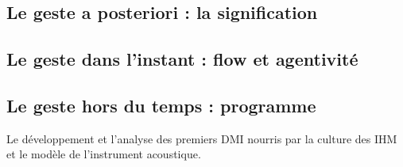 \subsection{Le geste a posteriori : la signification}


\subsection{Le geste dans l'instant : flow et agentivité}

\subsection{Le geste hors du temps : programme}



Le développement et l'analyse des premiers DMI nourris par la culture des IHM et le modèle de l'instrument acoustique.